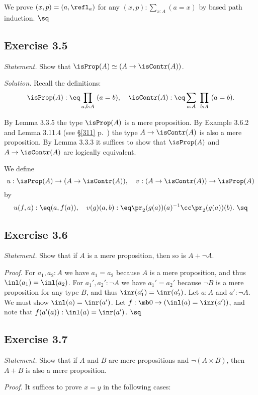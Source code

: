 \documentclass[12pt]{article}
\begin{document}
We prove $(x,p)=(a,\refl_a)$ for any $(x,p):\sum_{x:A}(a=x)$ by based path induction. $\sq$


\subsection{Exercise 3.5}

\emph{Statement.} Show that $\isProp(A)\simeq(A\to\isContr(A))$. 

\nn\emph{Solution.} Recall the definitions: 
$$
\isProp(A):\eq\prod_{a,b:A}\ (a=b),\quad\isContr(A):\eq\sum_{a:A}\ \prod_{b:A}\ (a=b).
$$

By Lemma 3.3.5 the type $\isProp(A)$ is a mere proposition. By Example 3.6.2 and Lemma 3.11.4 (see \S\ref{311} p.~\pageref{311}) the type $A\to\isContr(A)$ is also a mere proposition. By Lemma 3.3.3 it suffices to show that $\isProp(A)$ and $A\to\isContr(A)$ are logically equivalent. 

We define 
$$
u:\isProp(A)\to(A\to\isContr(A)),\quad v:(A\to\isContr(A))\to\isProp(A)
$$ 
by 
$$
u(f,a):\eq(a,f(a)),\quad v(g)(a,b):\eq\pr_2(g(a))(a)^{-1}\cc\pr_2(g(a))(b).\ \sq
$$


\subsection{Exercise 3.6}\label{e36}

\emph{Statement.} Show that if $A$ is a mere proposition, then so is $A+\neg A$.

\nn\emph{Proof.} For $a_1,a_2:A$ we have $a_1=a_2$ because $A$ is a mere proposition, and thus $\inl(a_1)=\inl(a_2)$. For $a_1',a_2':\neg A$ we have $a_1'=a_2'$ because $\neg B$ is a mere proposition for any type $B$, and thus $\inr(a_1')=\inr(a_2')$. Let $a:A$ and $a':\neg A$. We must show $\inl(a)=\inr(a')$. Let $f:\mb0\to(\inl(a)=\inr(a'))$, and note that $f(a'(a)):\inl(a)=\inr(a')$. $\sq$


\subsection{Exercise 3.7}

\emph{Statement.} Show that if $A$ and $B$ are mere propositions and $\neg(A\times B)$, then $A+B$ is also a mere proposition.

\emph{Proof.} %
It suffices to prove $x=y$ in the following cases:
\end{document}
